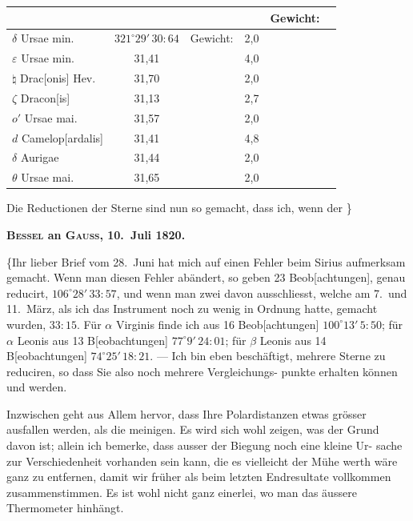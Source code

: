 \documentclass[12pt,a4paper]{article}
\theoremstyle{plain}
\theoremstyle{definition}
\theoremstyle{remark}
\begin{document}
\begin{center}
\begin{tabular}{l c c | l c c}
\toprule
& & & & Gewicht: \\
\midrule
$\delta$ Ursae min. & $321^\circ 29'\,30\!\!:\!\!64$ & Gewicht: & 2,0 \\
$\varepsilon$ Ursae min. & 31,41 & & 4,0 \\
$\natural$ Drac[onis] Hev. & 31,70 & & 2,0 \\
$\zeta$ Dracon[is] & 31,13 & & 2,7 \\
$o'$ Ursae mai. & 31,57 & & 2,0 \\
$d$ Camelop[ardalis] & 31,41 & & 4,8 \\
$\delta$ Aurigae & 31,44 & & 2,0 \\
$\theta$ Ursae mai. & 31,65 & & 2,0 \\
\bottomrule
\end{tabular}
\end{center}

Die Reductionen der Sterne sind nun so gemacht, dass ich, wenn der
\dotfill\}

\medskip
\begin{center}
\textbf{\textsc{Bessel} an \textsc{Gauss}, 10.\ Juli 1820.}
\end{center}

\medskip
\{Ihr lieber Brief vom 28.\ Juni hat mich auf einen Fehler beim Sirius
aufmerksam gemacht. \dotfill Wenn man diesen Fehler ab\"{a}ndert, so geben
23 Beob[achtungen], genau reducirt, $106^\circ 28'\,33\!\!:\!\!57$, und wenn man zwei davon
ausschliesst, welche am 7.\ und 11.\ M\"{a}rz, als ich das Instrument noch zu wenig
in Ordnung hatte, gemacht wurden, $33\!\!:\!\!15$. F\"{u}r $\alpha$ Virginis finde ich aus 16
Beob[achtungen] $100^\circ 13'\,5\!\!:\!\!50$; f\"{u}r $\alpha$ Leonis aus 13 B[eobachtungen] $77^\circ 9'\,24\!\!:\!\!01$;
f\"{u}r $\beta$ Leonis aus 14 B[eobachtungen] $74^\circ 25'\,18\!\!:\!\!21$. --- Ich bin eben besch\"{a}ftigt,
mehrere Sterne zu reduciren, so dass Sie also noch mehrere Vergleichungs-
punkte erhalten k\"{o}nnen und werden.

Inzwischen geht aus Allem hervor, dass Ihre Polardistanzen etwas gr\"{o}sser
ausfallen werden, als die meinigen. Es wird sich wohl zeigen, was der Grund
davon ist; allein ich bemerke, dass ausser der Biegung noch eine kleine Ur-
sache zur Verschiedenheit vorhanden sein kann, die es vielleicht der M\"{u}he
werth w\"{a}re ganz zu entfernen, damit wir fr\"{u}her als beim letzten Endresultate
vollkommen zusammenstimmen. Es ist wohl nicht ganz einerlei, wo man
das \"{a}ussere Thermometer hinh\"{a}ngt. \dotfill
\end{document}

